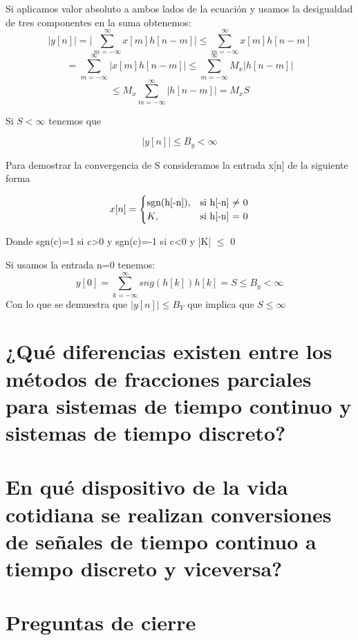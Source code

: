 	Si aplicamos valor absoluto a ambos lados de la ecuación y usamos la desigualdad de tres componentes en la suma obtenemos: 
	\begin{equation}
		\lvert y[n]\rvert = \lvert \sum_{m=-\infty}^{\infty}x[m]h[n-m] \rvert \leq \sum_{m=-\infty}^{\infty}x[m]h[n-m]
	\end{equation}		
	\begin{equation}
		=\sum_{m=-\infty}^{\infty}\lvert x[m]h[n-m] \rvert \leq \sum_{m=-\infty}^{\infty}M_x \lvert h[n-m] \rvert
	\end{equation}
	\begin{equation}
		\leq M_x \sum_{m=-\infty}^{\infty} \lvert h[n-m] \rvert = M_xS
	\end{equation}

	Si $S<\infty$ tenemos que 
	
	\begin{equation}
		|y[n]|\leq B_y < \infty
	\end{equation}
	
	Para demostrar la convergencia de S consideramos la entrada x[n] de la siguiente forma
	
	\[
	x[n]=
	\begin{cases}
		$sgn(h[-n])$, & \text{si h[-n]  $\neq$ 0} \\
		K, & \text{si h[-n] = 0}				\end{cases}
	\]
	
	Donde sgn(c)=1 si c>0 y sgn(c)=-1 si c<0 y |K| $\leq$ 0
	\newline
	
	Si usamos la entrada n=0 tenemos:
	\begin{equation}
		y[0]=\sum_{k=-\infty}^\infty sng(h[k]) h[k] = S \leq B_y < \infty
	\end{equation}
	Con lo que se demuestra que $|y[n]| \leq B_Y$ que implica que $S\leq\infty$

\section{¿Qué diferencias existen entre los métodos de fracciones parciales para sistemas de tiempo continuo y sistemas de tiempo discreto?}
\section{En qué dispositivo de la vida cotidiana se realizan conversiones de señales de tiempo continuo a tiempo discreto y viceversa?}

\section{Preguntas de cierre}

